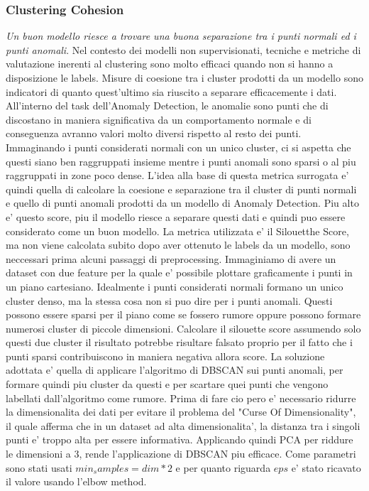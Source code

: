 \subsubsection{Clustering Cohesion}
\textit{Un buon modello riesce a trovare una buona separazione tra i punti normali ed i punti anomali}.
Nel contesto dei modelli non supervisionati, tecniche e metriche di valutazione inerenti al clustering sono molto efficaci quando non si hanno a disposizione le labels. Misure di coesione tra i cluster prodotti da un modello sono indicatori di quanto quest'ultimo sia riuscito a separare efficacemente i dati.
All'interno del task dell'Anomaly Detection, le anomalie sono punti che di discostano in maniera significativa da un comportamento normale e di conseguenza avranno valori molto diversi rispetto al resto dei punti. Immaginando i punti considerati normali con un unico cluster, ci si aspetta che questi siano ben raggruppati insieme mentre i punti anomali sono sparsi o al piu raggruppati in zone poco dense. 
L'idea alla base di questa metrica surrogata e' quindi quella di calcolare la coesione e separazione tra il cluster di punti normali e quello di punti anomali prodotti da un modello di Anomaly Detection. Piu alto e' questo score, piu il modello riesce a separare questi dati e quindi puo essere considerato come un buon modello.
La metrica utilizzata e' il Silouetthe Score, ma non viene calcolata subito dopo aver ottenuto le labels da un modello, sono neccessari prima alcuni passaggi di preprocessing.
Immaginiamo di avere un dataset con due feature per la quale e' possibile plottare graficamente i punti in un piano cartesiano. Idealmente i punti considerati normali formano un unico cluster denso, ma la stessa cosa non si puo dire per i punti anomali. Questi possono essere sparsi per il piano come se fossero rumore oppure possono formare numerosi cluster di piccole dimensioni. Calcolare il silouette score assumendo solo questi due cluster il risultato potrebbe risultare falsato proprio per il fatto che i punti sparsi contribuiscono in maniera negativa allora score.
La soluzione adottata e' quella di applicare l'algoritmo di DBSCAN sui punti anomali, per formare quindi piu cluster da questi e per scartare quei punti che vengono labellati dall'algoritmo come rumore.
Prima di fare cio pero e' necessario ridurre la dimensionalita dei dati per evitare il problema del "Curse Of Dimensionality", il quale afferma che in un dataset ad alta dimensionalita', la distanza tra i singoli punti e' troppo alta per essere informativa.
Applicando quindi PCA per riddure le dimensioni a 3, rende l'applicazione di DBSCAN piu efficace. Come parametri sono stati usati $min_samples=dim * 2$ e per quanto riguarda $eps$ e' stato ricavato il valore usando l'elbow method.

